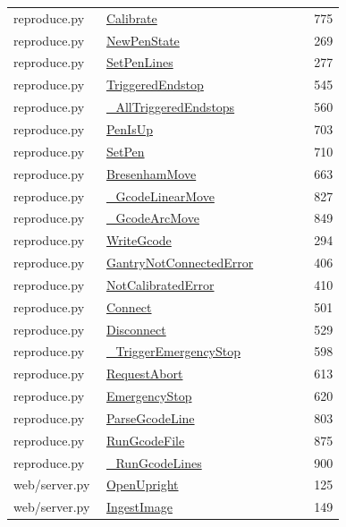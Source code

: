 \documentclass[11pt,a4paper,oneside]{report}
\begin{document}
\begin{longtable}{p{0.28\linewidth}p{0.48\linewidth}r}
reproduce.py & \hyperref[fn:reproduce:Calibrate]{Calibrate} & 775\\
reproduce.py & \hyperref[fn:reproduce:NewPenState]{NewPenState} & 269\\
reproduce.py & \hyperref[fn:reproduce:SetPenLines]{SetPenLines} & 277\\
reproduce.py & \hyperref[fn:reproduce:TriggeredEndstop]{TriggeredEndstop} & 545\\
reproduce.py & \hyperref[fn:reproduce:-AllTriggeredEndstops]{\_AllTriggeredEndstops} & 560\\
reproduce.py & \hyperref[fn:reproduce:PenIsUp]{PenIsUp} & 703\\
reproduce.py & \hyperref[fn:reproduce:SetPen]{SetPen} & 710\\
reproduce.py & \hyperref[fn:reproduce:BresenhamMove]{BresenhamMove} & 663\\
reproduce.py & \hyperref[fn:reproduce:-GcodeLinearMove]{\_GcodeLinearMove} & 827\\
reproduce.py & \hyperref[fn:reproduce:-GcodeArcMove]{\_GcodeArcMove} & 849\\
reproduce.py & \hyperref[fn:reproduce:WriteGcode]{WriteGcode} & 294\\
reproduce.py & \hyperref[fn:reproduce:GantryNotConnectedError]{GantryNotConnectedError} & 406\\
reproduce.py & \hyperref[fn:reproduce:NotCalibratedError]{NotCalibratedError} & 410\\
reproduce.py & \hyperref[fn:reproduce:Connect]{Connect} & 501\\
reproduce.py & \hyperref[fn:reproduce:Disconnect]{Disconnect} & 529\\
reproduce.py & \hyperref[fn:reproduce:-TriggerEmergencyStop]{\_TriggerEmergencyStop} & 598\\
reproduce.py & \hyperref[fn:reproduce:RequestAbort]{RequestAbort} & 613\\
reproduce.py & \hyperref[fn:reproduce:EmergencyStop]{EmergencyStop} & 620\\
reproduce.py & \hyperref[fn:reproduce:ParseGcodeLine]{ParseGcodeLine} & 803\\
reproduce.py & \hyperref[fn:reproduce:RunGcodeFile]{RunGcodeFile} & 875\\
reproduce.py & \hyperref[fn:reproduce:-RunGcodeLines]{\_RunGcodeLines} & 900\\
web/server.py & \hyperref[fn:web-server:OpenUpright]{OpenUpright} & 125\\
web/server.py & \hyperref[fn:web-server:IngestImage]{IngestImage} & 149\\

\end{longtable}
\end{document}
